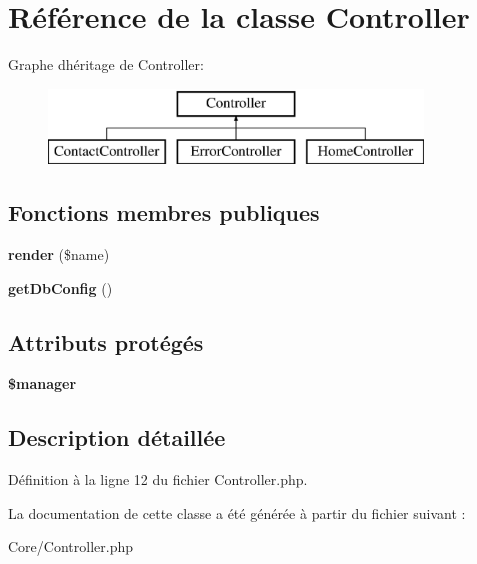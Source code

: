 \hypertarget{class_core_1_1_controller}{}\section{Référence de la classe Controller}
\label{class_core_1_1_controller}
Graphe d\textquotesingle{}héritage de Controller\+:\begin{figure}[H]
\begin{center}
\leavevmode
\includegraphics[height=2.000000cm]{class_core_1_1_controller}
\end{center}
\end{figure}
\subsection*{Fonctions membres publiques}
\begin{DoxyCompactItemize}
\item 
{\bfseries render} (\$name)\hypertarget{class_core_1_1_controller_aa6b87486d439648725df4d9141f92413}{}\label{class_core_1_1_controller_aa6b87486d439648725df4d9141f92413}

\item 
{\bfseries get\+Db\+Config} ()\hypertarget{class_core_1_1_controller_aae1dd9d413884b12f0efeeaba3ec1a78}{}\label{class_core_1_1_controller_aae1dd9d413884b12f0efeeaba3ec1a78}

\end{DoxyCompactItemize}
\subsection*{Attributs protégés}
\begin{DoxyCompactItemize}
\item 
{\bfseries \$manager}\hypertarget{class_core_1_1_controller_a4621b1cd69b1417c9fb966c825299de1}{}\label{class_core_1_1_controller_a4621b1cd69b1417c9fb966c825299de1}

\end{DoxyCompactItemize}


\subsection{Description détaillée}


Définition à la ligne 12 du fichier Controller.\+php.



La documentation de cette classe a été générée à partir du fichier suivant \+:\begin{DoxyCompactItemize}
\item 
Core/Controller.\+php\end{DoxyCompactItemize}

